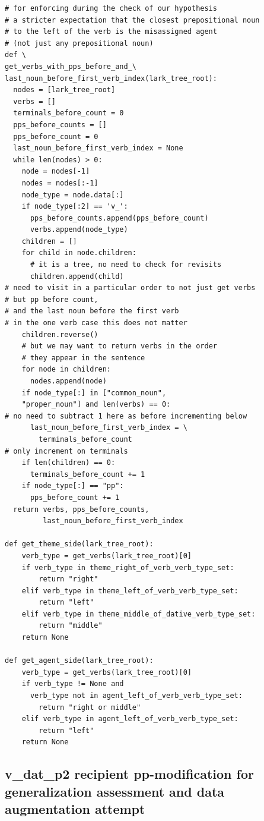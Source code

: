 \documentclass[11pt]{article}
\begin{document}
\begin{tiny}
\begin{verbatim}
# for enforcing during the check of our hypothesis
# a stricter expectation that the closest prepositional noun
# to the left of the verb is the misassigned agent
# (not just any prepositional noun)
def \
get_verbs_with_pps_before_and_\
last_noun_before_first_verb_index(lark_tree_root):
  nodes = [lark_tree_root]
  verbs = []
  terminals_before_count = 0
  pps_before_counts = []
  pps_before_count = 0
  last_noun_before_first_verb_index = None
  while len(nodes) > 0:
    node = nodes[-1]
    nodes = nodes[:-1]
    node_type = node.data[:]
    if node_type[:2] == 'v_':
      pps_before_counts.append(pps_before_count)
      verbs.append(node_type)
    children = []
    for child in node.children:
      # it is a tree, no need to check for revisits
      children.append(child)
# need to visit in a particular order to not just get verbs
# but pp before count, 
# and the last noun before the first verb
# in the one verb case this does not matter 
    children.reverse()
    # but we may want to return verbs in the order
    # they appear in the sentence
    for node in children:
      nodes.append(node)
    if node_type[:] in ["common_noun",
    "proper_noun"] and len(verbs) == 0:
# no need to subtract 1 here as before incrementing below
      last_noun_before_first_verb_index = \
        terminals_before_count
# only increment on terminals
    if len(children) == 0:
      terminals_before_count += 1
    if node_type[:] == "pp":
      pps_before_count += 1
  return verbs, pps_before_counts,
         last_noun_before_first_verb_index

def get_theme_side(lark_tree_root):
    verb_type = get_verbs(lark_tree_root)[0]
    if verb_type in theme_right_of_verb_verb_type_set:
        return "right"
    elif verb_type in theme_left_of_verb_verb_type_set:
        return "left"
    elif verb_type in theme_middle_of_dative_verb_type_set:
        return "middle"
    return None

def get_agent_side(lark_tree_root):
    verb_type = get_verbs(lark_tree_root)[0]
    if verb_type != None and 
      verb_type not in agent_left_of_verb_verb_type_set:
        return "right or middle"
    elif verb_type in agent_left_of_verb_verb_type_set:
        return "left"
    return None
\end{verbatim}
\end{tiny}

\clearpage
\subsection{v\_dat\_p2 recipient pp-modification for generalization assessment and data augmentation attempt}
\label{v_dat_p2_recipient_pp-modification_for_generalization_assessment_and_data_augmentation_attempt}
\end{document}
